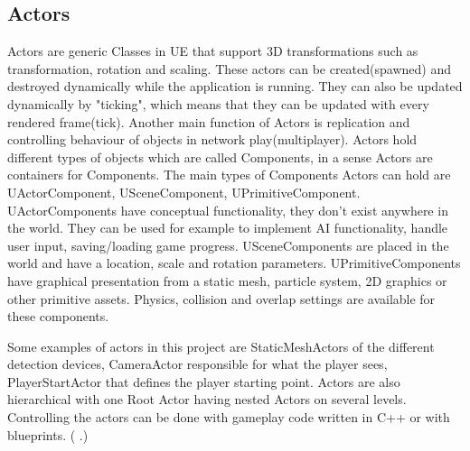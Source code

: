 \documentclass[12pt, a4paper,oneside, nocenter]{thesis}
\newcommand{\citeyeartitlexamk}[1]{(\usebibentry{#1}{title} \citeyear{#1}.)}
\begin{document}
\subsection{Actors}
Actors are generic Classes in UE that support 3D transformations such as transformation, rotation and scaling. These actors can be created(spawned) and destroyed dynamically while the application is running. They can also be updated dynamically by "ticking", which means that they can be updated with every rendered frame(tick). Another main function of Actors is replication and controlling behaviour of objects in network play(multiplayer). Actors hold different types of objects which are called Components, in a sense Actors are containers for Components. The main types of Components Actors can hold are UActorComponent, USceneComponent, UPrimitiveComponent. UActorComponents have conceptual functionality, they don't exist anywhere in the world. They can be used for example to implement AI functionality, handle user input, saving/loading game progress. USceneComponents are placed in the world and have a location, scale and rotation parameters. UPrimitiveComponents have graphical presentation from a static mesh, particle system, 2D graphics or other primitive assets. Physics, collision and overlap settings are available for these components.  
\par
Some examples of actors in this project are StaticMeshActors of the different detection devices, CameraActor responsible for what the player sees, PlayerStartActor that defines the player starting point. Actors are also hierarchical with one Root Actor having nested Actors on several levels. Controlling the actors can be done with gameplay code written in C++ or with blueprints. \citeyeartitlexamk{ue-actors}
\end{document}
